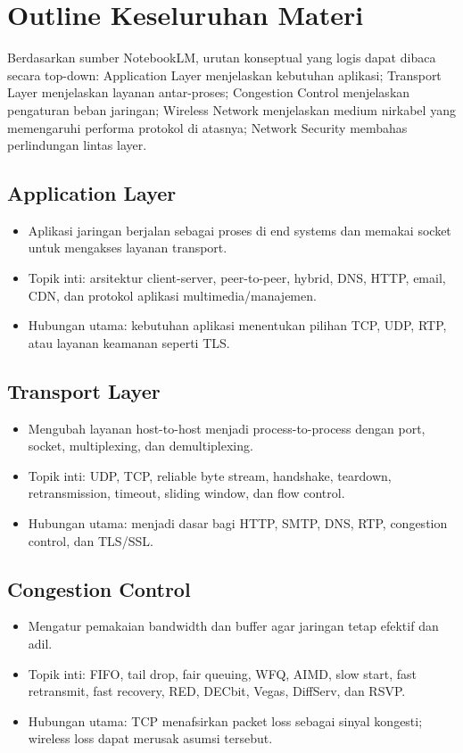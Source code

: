\documentclass[11pt,a4paper]{article}
\begin{document}
\section{Outline Keseluruhan Materi}

Berdasarkan sumber NotebookLM, urutan konseptual yang logis dapat dibaca secara top-down: Application Layer menjelaskan kebutuhan aplikasi; Transport Layer menjelaskan layanan antar-proses; Congestion Control menjelaskan pengaturan beban jaringan; Wireless Network menjelaskan medium nirkabel yang memengaruhi performa protokol di atasnya; Network Security membahas perlindungan lintas layer.

\subsection{Application Layer}
\begin{itemize}
    \item Aplikasi jaringan berjalan sebagai proses di end systems dan memakai socket untuk mengakses layanan transport.
    \item Topik inti: arsitektur client-server, peer-to-peer, hybrid, DNS, HTTP, email, CDN, dan protokol aplikasi multimedia/manajemen.
    \item Hubungan utama: kebutuhan aplikasi menentukan pilihan TCP, UDP, RTP, atau layanan keamanan seperti TLS.
\end{itemize}

\subsection{Transport Layer}
\begin{itemize}
    \item Mengubah layanan host-to-host menjadi process-to-process dengan port, socket, multiplexing, dan demultiplexing.
    \item Topik inti: UDP, TCP, reliable byte stream, handshake, teardown, retransmission, timeout, sliding window, dan flow control.
    \item Hubungan utama: menjadi dasar bagi HTTP, SMTP, DNS, RTP, congestion control, dan TLS/SSL.
\end{itemize}

\subsection{Congestion Control}
\begin{itemize}
    \item Mengatur pemakaian bandwidth dan buffer agar jaringan tetap efektif dan adil.
    \item Topik inti: FIFO, tail drop, fair queuing, WFQ, AIMD, slow start, fast retransmit, fast recovery, RED, DECbit, Vegas, DiffServ, dan RSVP.
    \item Hubungan utama: TCP menafsirkan packet loss sebagai sinyal kongesti; wireless loss dapat merusak asumsi tersebut.
\end{itemize}
\end{document}
